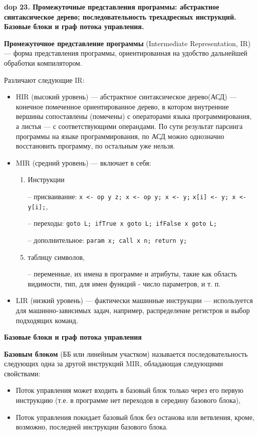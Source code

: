 \textbf{\LARGE dop 23. Промежуточные  представления  программы:  абстрактное  синтаксическое  дерево;  последовательность трехадресных инструкций. Базовые блоки и граф потока управления.}

\textbf{Промежуточное представление программы} (Intermediate Representation, IR) --- форма представления программы, ориентированная на удобство дальнейшей обработки компилятором.

Различают следующие IR:
\begin{itemize}
    \item HIR (высокий уровень) --- абстрактное синтаксическое дерево(АСД) --- конечное помеченное ориентированное дерево, в котором внутренние вершины сопоставлены (помечены) с операторами языка программирования, а листья --- с соответствующими операндами. По сути результат парсинга программы на языке программирования, по АСД можно однозначно восстановить программу, по остальным уже нельзя.
    \item MIR (средний уровень) --- включает в себя:
    \begin{enumerate}
        \item Инструкции
        \item[--] присваивание: \texttt{x <- op y z; x <- op y; x <- y;}
        \texttt{x[i] <- y; x <- y[i];},
        \item[--] переходы: \texttt{goto L; ifTrue x goto L; ifFalse x goto L;}
        \item[--] дополнительное: \texttt{param x; call x n; return y;}
        \item таблицу символов,
        \item[--] переменные, их имена в программе и атрибуты, такие как область видимости, тип, для имен функций - число параметров, и т. п.
    \end{enumerate}
    \item LIR (низкий уровень) --- фактически машинные инструкции --- используется для машинно-зависимых задач, например, распределение регистров и выбор подходящих команд.
\end{itemize}

\textbf{Базовые блоки и граф потока управления}

\textbf{Базовым блоком} (ББ или линейным участком) называется последовательность следующих одна за другой инструкций MIR, обладающая следующими свойствами:
\begin{itemize}
    \item Поток управления может входить в базовый блок только через его первую инструкцию (т.е. в программе нет переходов в середину базового блока),
    \item Поток управления покидает базовый блок без останова или ветвления, кроме, возможно, последней инструкции базового блока.
\end{itemize}


